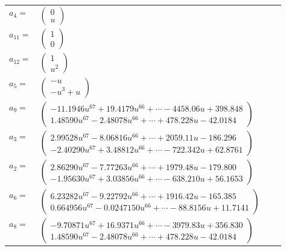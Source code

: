 \documentclass[1p]{elsarticle_modified}
\theoremstyle{definition}
\begin{document}
\begin{tabular}{m{7pt} m{180pt} m{7pt} m{180pt} }
\flushright $a_{4}=$&$\begin{pmatrix}0\\u\end{pmatrix}$ \\
\flushright $a_{11}=$&$\begin{pmatrix}1\\0\end{pmatrix}$ \\
\flushright $a_{12}=$&$\begin{pmatrix}1\\u^2\end{pmatrix}$ \\
\flushright $a_{5}=$&$\begin{pmatrix}- u\\- u^3+u\end{pmatrix}$ \\
\flushright $a_{9}=$&$\begin{pmatrix}-11.1946 u^{67}+19.4179 u^{66}+\cdots-4458.06 u+398.848\\1.48590 u^{67}-2.48078 u^{66}+\cdots+478.228 u-42.0184\end{pmatrix}$ \\
\flushright $a_{3}=$&$\begin{pmatrix}2.99528 u^{67}-8.06816 u^{66}+\cdots+2059.11 u-186.296\\-2.40290 u^{67}+3.48812 u^{66}+\cdots-722.342 u+62.8761\end{pmatrix}$ \\
\flushright $a_{2}=$&$\begin{pmatrix}2.86290 u^{67}-7.77263 u^{66}+\cdots+1979.48 u-179.800\\-1.95630 u^{67}+3.03856 u^{66}+\cdots-638.210 u+56.1653\end{pmatrix}$ \\
\flushright $a_{6}=$&$\begin{pmatrix}6.23282 u^{67}-9.22792 u^{66}+\cdots+1916.42 u-165.385\\0.664956 u^{67}-0.0247150 u^{66}+\cdots-88.8156 u+11.7141\end{pmatrix}$ \\
\flushright $a_{8}=$&$\begin{pmatrix}-9.70871 u^{67}+16.9371 u^{66}+\cdots-3979.83 u+356.830\\1.48590 u^{67}-2.48078 u^{66}+\cdots+478.228 u-42.0184\end{pmatrix}$ \\

\end{tabular}
\end{document}
